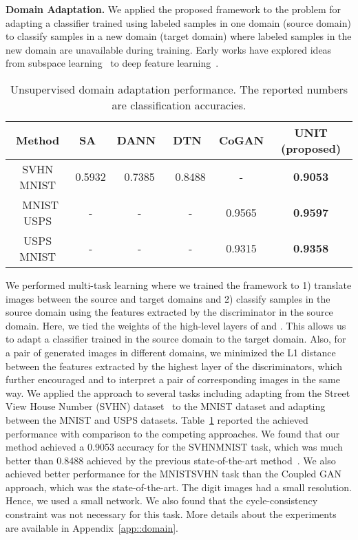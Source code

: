 \documentclass{article}
\begin{document}
{\bf Domain Adaptation.} We applied the proposed framework to the problem for adapting a classifier trained using labeled samples in one domain (source domain) to classify samples in a new domain (target domain) where labeled samples in the new domain are unavailable during training. Early works have explored ideas from subspace learning~\cite{fernando2013unsupervised} to deep feature learning~\cite{ganin2016domain,liu2016coupled,taigman2016unsupervised}. 

\begin{table}[t!]
\caption{\small Unsupervised domain adaptation performance. The reported numbers are classification accuracies.}\label{tab::svhn2mnist}
\centering
\small
{\tabcolsep=8pt
\begin{tabularx}{355pt}{cccccc}
Method & SA~\cite{fernando2013unsupervised} & DANN~\cite{ganin2016domain} & DTN~\cite{taigman2016unsupervised}  &  CoGAN & UNIT (proposed) \tabularnewline\midrule
SVHN MNIST & 0.5932 & 0.7385 & 0.8488 & - &{\bf 0.9053}\tabularnewline\
MNIST USPS & - & -  & -  & 0.9565 &{\bf 0.9597}\tabularnewline
USPS MNIST & - & -  & -  & 0.9315 &{\bf 0.9358}\tabularnewline
\end{tabularx}}
\vspace{-5mm}
\end{table}

We performed multi-task learning where we trained the framework to 1) translate images between the source and target domains and 2) classify samples in the source domain using the features extracted by the discriminator in the source domain. Here, we tied the weights of the high-level layers of  and . This allows us to adapt a classifier trained in the source domain to the target domain. Also, for a pair of generated images in different domains, we minimized the L1 distance between the features extracted by the highest layer of the discriminators, which further encouraged  and  to interpret a pair of corresponding images in the same way. We applied the approach to several tasks including adapting from the Street View House Number (SVHN) dataset~\cite{netzer2011reading} to the MNIST dataset and adapting between the MNIST and USPS datasets. Table~\ref{tab::svhn2mnist} reported the achieved performance with comparison to the competing approaches. We found that our method achieved a 0.9053 accuracy for the SVHNMNIST task, which was much better than 0.8488 achieved by the previous state-of-the-art method~\cite{taigman2016unsupervised}. We also achieved better performance for the MNISTSVHN task than the Coupled GAN approach, which was the state-of-the-art. The digit images had a small resolution. Hence, we used a small network. We also found that the cycle-consistency constraint was not necessary for this task. More details about the experiments are available in Appendix~\ref{app::domain}.
\end{document}
